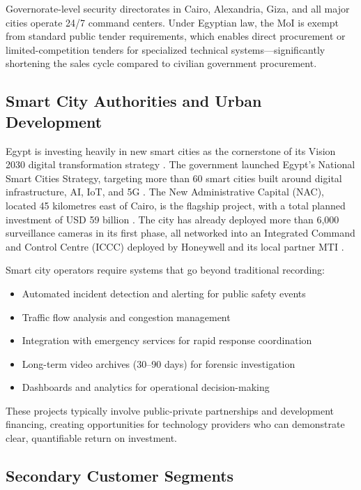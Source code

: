 Governorate-level security directorates in Cairo, Alexandria, Giza, and all major cities operate 24/7 command centers. Under Egyptian law, the MoI is exempt from standard public tender requirements, which enables direct procurement or limited-competition tenders for specialized technical systems—significantly shortening the sales cycle compared to civilian government procurement.

\subsection{Smart City Authorities and Urban Development}

Egypt is investing heavily in new smart cities as the cornerstone of its Vision 2030 digital transformation strategy \cite{egypt_smart_cities_strategy}. The government launched Egypt's National Smart Cities Strategy, targeting more than 60 smart cities built around digital infrastructure, AI, IoT, and 5G \cite{egypt_smart_cities_strategy, egypt_smart_city_ahram}. The New Administrative Capital (NAC), located 45 kilometres east of Cairo, is the flagship project, with a total planned investment of USD 59 billion \cite{egypt_nac_59b}. The city has already deployed more than 6,000 surveillance cameras in its first phase, all networked into an Integrated Command and Control Centre (ICCC) deployed by Honeywell and its local partner MTI \cite{honeywell_nac, nac_cctv_context}.

Smart city operators require systems that go beyond traditional recording:
\begin{itemize}
    \item Automated incident detection and alerting for public safety events
    \item Traffic flow analysis and congestion management
    \item Integration with emergency services for rapid response coordination
    \item Long-term video archives (30--90 days) for forensic investigation
    \item Dashboards and analytics for operational decision-making
\end{itemize}

These projects typically involve public-private partnerships and development financing, creating opportunities for technology providers who can demonstrate clear, quantifiable return on investment.

\subsection{Secondary Customer Segments}

